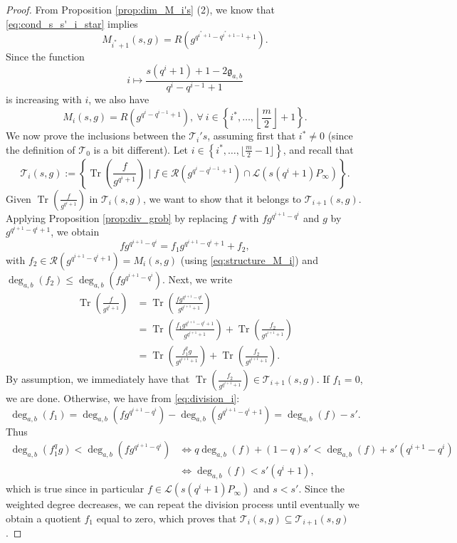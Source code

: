 \documentclass[a4paper]{amsart}
\theoremstyle{definition}
\theoremstyle{remark}
\newcommand{\calL}{\mathcal{L}}
\newcommand{\calR}{\mathcal{R}}
\newcommand{\calT}{\mathcal{T}}
\newcommand{\Tr}[1]{\operatorname{Tr}\left(#1\right)}
\newcommand{\set}[1]{\left\{#1\right\}}
\newcommand{\degab}[1]{\deg_{a,b}\left(#1\right)}
\begin{document}
\begin{proof}
From Proposition \ref{prop:dim_M_i's} (2), we know that \eqref{eq:cond_s_s'_i_star} implies $$M_{i^*+1}(s,g) = R(g^{q^{i^*+1}-q^{i^*+1-1}+1}).$$ 
Since the function $$i \mapsto \dfrac{s(q^i+1)+1-2\mathfrak{g}_{a,b}}{q^i-q^{i-1}+1}$$ 
is increasing with $i$, we also have
\begin{equation} \label{eq:structure_M_i}
M_{i}(s,g) = R(g^{q^{i}-q^{i-1}+1}), \ \forall \ i \in \set{i^*,\dots,\left\lfloor \frac{m}{2}\right\rfloor+1}.
\end{equation} 
We now prove the inclusions between the $\calT_i's$, assuming first that $i^* \neq 0$ (since the definition of $\calT_0$ is a bit different). Let $i \in \set{i^*,\dots,\lfloor \frac{m}{2}-1 \rfloor}$, and recall that 
$$\calT_i(s,g) := \set{\Tr{\frac{f}{g^{q^i+1}}} \mid f \in \calR(g^{q^i-q^{i-1}+1})\cap \calL(s(q^i+1)P_\infty)}.$$
Given $\Tr{\frac{f}{g^{q^i+1}}}$ in $\calT_i(s,g)$, we want to show that it belongs to $\calT_{i+1}(s,g)$. Applying Proposition \ref{prop:div_grob} by replacing $f$ with $fg^{q^{i+1}-q^i}$ and $g$ by $g^{q^{i+1}-q^i+1}$, we obtain
\begin{equation} \label{eq:division_i}
fg^{q^{i+1}-q^i} = f_1g^{q^{i+1}-q^i+1} + f_2,
\end{equation}
with $f_2 \in \calR(g^{q^{i+1}-q^i+1}) = M_i(s,g)$ (using \eqref{eq:structure_M_i}) and $\degab{f_2} \leq \degab{fg^{q^{i+1}-q^i}}$. Next, we write
\begin{align*}
    \Tr{\frac{f}{g^{q^i+1}}} &= \Tr{\frac{fg^{q^{i+1}-q^i}}{g^{q^{i+1}+1}}} \\
                             &= \Tr{\frac{f_1g^{q^{i+1}-q^i+1}}{g^{q^{i+1}+1}}} + \Tr{\frac{f_2}{g^{q^{i+1}+1}}} \\
                             &= \Tr{\frac{f_1^qg}{g^{q^{i+1}+1}}} + \Tr{\frac{f_2}{g^{q^{i+1}+1}}}.
\end{align*}
By assumption, we immediately have that $\Tr{\frac{f_2}{g^{q^{i+1}+1}}} \in \calT_{i+1}(s,g).$
If $f_1=0$, we are done. Otherwise, we have from \eqref{eq:division_i}:
$$\degab{f_1} = \degab{fg^{q^{i+1}-q^i}} - \degab{g^{q^{i+1}-q^i+1}} = \degab{f}-s'.$$
Thus
\begin{align*}
     \degab{f_1^qg} < \degab{fg^{q^{i+1}-q^i}} & \iff q\degab{f} +(1-q)s' < \degab{f} +s'(q^{i+1}-q^i) \\
                                               & \iff \degab{f} < s'(q^{i}+1),
\end{align*}
which is true since in particular $f \in \calL(s(q^i+1)P_\infty)$ and $s<s'$. Since the weighted degree decreases, we can repeat the division process until eventually we obtain a quotient $f_1$ equal to zero, which proves that $\calT_i(s,g) \subseteq \calT_{i+1}(s,g)$.


\end{proof}
\end{document}
